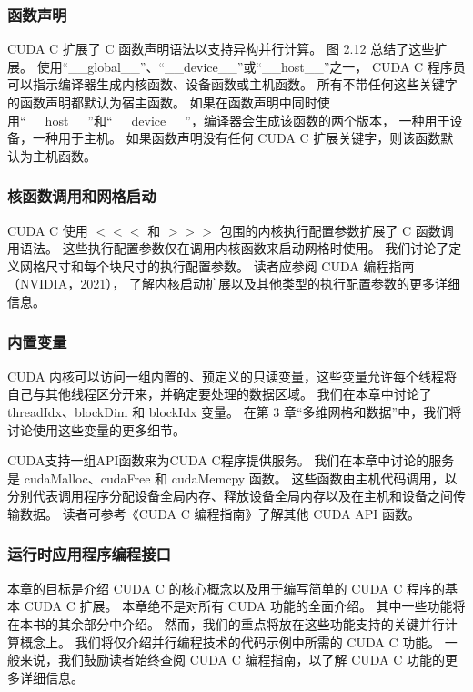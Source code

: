 \subsubsection{函数声明}
CUDA C 扩展了 C 函数声明语法以支持异构并行计算。 图 2.12 总结了这些扩展。 
使用“\_\_global\_\_”、“\_\_device\_\_”或“\_\_host\_\_”之一，
CUDA C 程序员可以指示编译器生成内核函数、设备函数或主机函数。 所有不带任何这些关键字的函数声明都默认为宿主函数。 
如果在函数声明中同时使用“\_\_host\_\_”和“\_\_device\_\_”，编译器会生成该函数的两个版本，
一种用于设备，一种用于主机。 如果函数声明没有任何 CUDA C 扩展关键字，则该函数默认为主机函数。

\subsubsection{核函数调用和网格启动}
CUDA C 使用 $<<<$ 和 $>>>$ 包围的内核执行配置参数扩展了 C 函数调用语法。
这些执行配置参数仅在调用内核函数来启动网格时使用。 
我们讨论了定义网格尺寸和每个块尺寸的执行配置参数。 读者应参阅 CUDA 编程指南（NVIDIA，2021），
了解内核启动扩展以及其他类型的执行配置参数的更多详细信息。


\subsubsection{内置变量}
CUDA 内核可以访问一组内置的、预定义的只读变量，这些变量允许每个线程将自己与其他线程区分开来，并确定要处理的数据区域。 
我们在本章中讨论了 threadIdx、blockDim 和 blockIdx 变量。 
在第 3 章“多维网格和数据”中，我们将讨论使用这些变量的更多细节。

CUDA支持一组API函数来为CUDA C程序提供服务。 我们在本章中讨论的服务是 cudaMalloc、cudaFree 和 cudaMemcpy 函数。 
这些函数由主机代码调用，以分别代表调用程序分配设备全局内存、释放设备全局内存以及在主机和设备之间传输数据。 
读者可参考《CUDA C 编程指南》了解其他 CUDA API 函数。


\subsubsection{运行时应用程序编程接口}
本章的目标是介绍 CUDA C 的核心概念以及用于编写简单的 CUDA C 程序的基本 CUDA C 扩展。 
本章绝不是对所有 CUDA 功能的全面介绍。 其中一些功能将在本书的其余部分中介绍。 
然而，我们的重点将放在这些功能支持的关键并行计算概念上。 我们将仅介绍并行编程技术的代码示例中所需的 CUDA C 功能。 
一般来说，我们鼓励读者始终查阅 CUDA C 编程指南，以了解 CUDA C 功能的更多详细信息。


